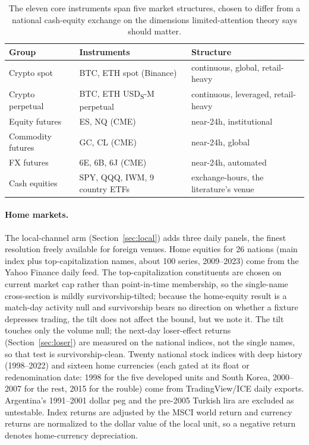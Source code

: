 \documentclass[12pt]{article}
\begin{document}
\begin{table}[h]\centering\small\setlength{\tabcolsep}{3pt}
\caption{The eleven core instruments span five market structures, chosen to differ from a national cash-equity exchange on the dimensions limited-attention theory says should matter.}\label{tab:universe}
\begin{tabular}{lll}\toprule
Group & Instruments & Structure \\\midrule
Crypto spot & BTC, ETH spot (Binance) & continuous, global, retail-heavy \\
Crypto perpetual & BTC, ETH USD\textsubscript{S}-M perpetual & continuous, leveraged, retail-heavy \\
Equity futures & ES, NQ (CME) & near-24h, institutional \\
Commodity futures & GC, CL (CME) & near-24h, global \\
FX futures & 6E, 6B, 6J (CME) & near-24h, automated \\
Cash equities & SPY, QQQ, IWM, 9 country ETFs & exchange-hours, the literature's venue \\\bottomrule
\end{tabular}
\end{table}

\paragraph{Home markets.} The local-channel arm (Section~\ref{sec:local}) adds three daily panels, the finest resolution freely available for foreign venues. Home equities for 26 nations (main index plus top-capitalization names, about 100 series, 2009--2023) come from the Yahoo Finance daily feed. The top-capitalization constituents are chosen on current market cap rather than point-in-time membership, so the single-name cross-section is mildly survivorship-tilted; because the home-equity result is a match-day activity null and survivorship bears no direction on whether a fixture depresses trading, the tilt does not affect the bound, but we note it. The tilt touches only the volume null; the next-day loser-effect returns (Section~\ref{sec:loser}) are measured on the national indices, not the single names, so that test is survivorship-clean. Twenty national stock indices with deep history (1998--2022) and sixteen home currencies (each gated at its float or redenomination date: 1998 for the five developed units and South Korea, 2000--2007 for the rest, 2015 for the rouble) come from TradingView/ICE daily exports. Argentina's 1991--2001 dollar peg and the pre-2005 Turkish lira are excluded as untestable. Index returns are adjusted by the MSCI world return and currency returns are normalized to the dollar value of the local unit, so a negative return denotes home-currency depreciation.
\end{document}
